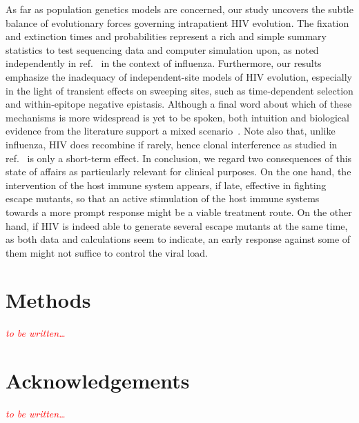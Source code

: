 \documentclass[12pt,a4paper,notitlepage,onecolumn]{article}
\newcommand{\comment}[1]{\textit{\textcolor{red}{#1}}}
\begin{document}
As far as population genetics models are concerned, our study uncovers the
subtle balance of evolutionary forces governing intrapatient HIV evolution. The
fixation and extinction times and probabilities represent a rich and simple
summary statistics to test sequencing data and computer simulation upon, as
noted independently in ref.~\citep{strelkowa_clonal_2012} in the context of
influenza. Furthermore, our results emphasize the inadequacy of independent-site
models of HIV evolution, especially in the light of transient effects on
sweeping sites, such as time-dependent selection and within-epitope negative
epistasis. Although a final word about which of these mechanisms is more
widespread is yet to be spoken, both intuition and biological evidence from the
literature support a mixed scenario~\citep{richman_rapid_2003,
moore_limited_2009}. Note also that, unlike influenza, HIV does recombine if
rarely, hence clonal interference as studied in
ref.~\citep{strelkowa_clonal_2012} is only a short-term effect. In conclusion,
we regard two consequences of this state of affairs as particularly relevant for
clinical purposes. On the one hand, the intervention of the host immune system
appears, if late, effective in fighting escape mutants, so that an active
stimulation of the host immune systems towards a more prompt response might be a
viable treatment route. On the other hand, if HIV is indeed able to generate
several escape mutants at the same time, as both data and calculations seem to
indicate, an early response against some of them might not suffice to control
the viral load.

\section{Methods}
\comment{to be written\dots}
\section*{Acknowledgements}
\comment{to be written\dots}




\end{document}
